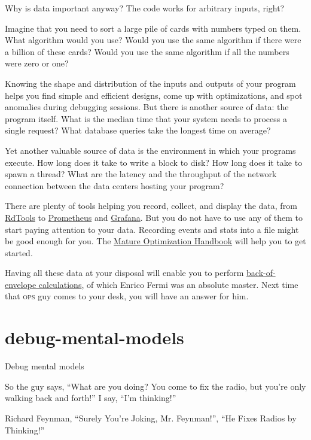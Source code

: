 \documentclass{article}
\begin{document}
Why is data important anyway?
The code works for arbitrary inputs, right?

Imagine that you need to sort a large pile of cards with numbers typed on them.
What algorithm would you use?
Would you use the same algorithm if there were a billion of these cards?
Would you use the same algorithm if all the numbers were zero or one?

Knowing the shape and distribution of the inputs and outputs of your program helps you find simple and efficient designs, come up with optimizations, and spot anomalies during debugging sessions.
But there is another source of data: the program itself.
What is the median time that your system needs to process a single request?
What database queries take the longest time on average?

Yet another valuable source of data is the environment in which your programs execute.
How long does it take to write a block to disk?
How long does it take to spawn a thread?
What are the latency and the throughput of the network connection between the data centers hosting your program?

There are plenty of tools helping you record, collect, and display the data, from \href{https://rdtools.readthedocs.io/en/stable/}{RdTools} to \href{https://prometheus.io/}{Prometheus} and \href{https://grafana.com/}{Grafana}.
But you do not have to use any of them to start paying attention to your data.
Recording events and stats into a file might be good enough for you.
The \href{https://carlos.bueno.org/optimization/}{Mature Optimization Handbook} will help you to get started.

Having all these data at your disposal will enable you to perform \href{https://en.wikipedia.org/wiki/Back-of-the-envelope_calculation}{back-of-envelope calculations}, of which Enrico Fermi was an absolute master.
Next time that \textsc{ops} guy comes to your desk, you will have an answer for him.

\section{debug-mental-models}{Debug mental models}

\epigraph{
    So the guy says, ``What are you doing? You come to fix the radio, but you're only walking back and forth!''
    I say, ``I'm thinking!''
}{Richard Feynman, ``Surely You're Joking, Mr. Feynman!'', ``He Fixes Radios by Thinking!''}
\end{document}
